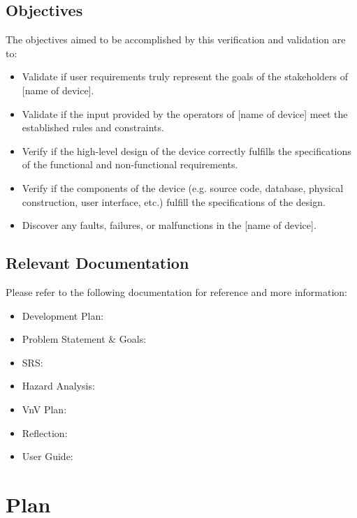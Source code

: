 \documentclass[12pt, titlepage]{article}
\begin{document}
\subsection{Objectives}

The objectives aimed to be accomplished by this verification and validation are to:

\begin{itemize}
  \item Validate if user requirements truly represent the goals of the stakeholders of [name of device].
  \item Validate if the input provided by the operators of [name of device] meet the established rules and constraints.
  \item Verify if the high-level design of the device correctly fulfills the specifications of the functional and non-functional requirements.
  \item Verify if the components of the device (e.g. source code, database, physical construction, user interface, etc.) fulfill the specifications of the design.
  \item Discover any faults, failures, or malfunctions in the [name of device].
\end{itemize}

\subsection{Relevant Documentation}

Please refer to the following documentation for reference and more information:

\begin{itemize}
  \item Development Plan: \citet{Development_Plan}
  \item Problem Statement \& Goals: \citet{Prob_n_Goals}
  \item SRS: \citet{SRS}
  \item Hazard Analysis: \citet{Hazard_Analysis}
  \item VnV Plan: \citet{VnV_Plan}
  \item Reflection: \citet{Reflection}
  \item User Guide: \citet{User_Guide}
\end{itemize}

\section{Plan}
\end{document}
